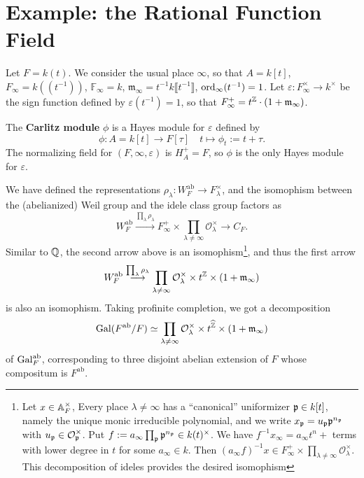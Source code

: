 \documentclass{article}
\newcommand{\F}{\mathbb{F}}
\renewcommand{\O}{\mathcal{O}}
\newcommand{\m}{\mathfrak{m}}
\newcommand{\llpar}{(\!(}
\newcommand{\rrpar}{)\!)}
\newcommand{\ab}{\mathrm{ab}}
\begin{document}
\section{Example: the Rational Function Field}
Let $F = k(t)$.
We consider the usual place $\infty$, so that $A = k[t]$,
$F_\infty = k\llpar t^{-1}\rrpar$,
$\F_\infty = k$,
$\m_\infty = t^{-1}k\llbracket t^{-1}\rrbracket$,
$\operatorname{ord}_{\infty}(t^{-1}) = 1$.
Let $\varepsilon : F_\infty^\times\to k^\times$ be the sign function defined by $\varepsilon(t^{-1}) = 1$,
so that $F_\infty^+ = t^{\Z}\cdot(1 + \m_\infty)$.


The \textbf{Carlitz module} $\phi$ is a Hayes module for $\varepsilon$ defined by \[\phi : A = k[t]\to F[\tau]\quad t\mapsto \phi_t := t + \tau.\]
The normalizing field for $(F, \infty, \varepsilon)$ is $H_A^+ = F$,
so $\phi$ is the only Hayes module for $\varepsilon$.

We have defined the representations $\rho_\lambda : W_F^\ab\to F_\lambda^\times$,
and the isomophism between the (abelianized) Weil group and the idele class group factors as
\begin{equation}\label{formula: the isomophism from Weil group of rational function field to idele class group}
    W_F^\ab \stackrel{\prod_{\lambda}\rho_\lambda}{\longrightarrow} F_\infty^+\times\prod_{\lambda\ne\infty}\O_\lambda^\times\to C_F.
\end{equation}
Similar to $\mathbb{Q}$, the second arrow above is an isomophism\footnote{
Let $x\in \mathbb{A}_F^\times$,
Every place $\lambda\ne\infty$ has a ``canonical'' uniformizer $\mathfrak{p}\in k[t]$, namely the unique monic irreducible polynomial,
and we write $x_{\mathfrak{p}} = u_{\mathfrak{p}}\mathfrak{p}^{n_{\mathfrak{p}}}$ with $u_\p\in \O_\p^\times$.
Put $f := a_\infty\prod_{\mathfrak{p}}\mathfrak{p}^{n_{\mathfrak{p}}}\in k(t)^\times$.
We have $f^{-1}x_\infty = a_\infty t^{n} + {}$ terms with lower degree in $t$ for some $a_\infty\in k$.
Then $(a_\infty f)^{-1}x\in F_\infty^+\times\prod_{\lambda\ne\infty}\O_\lambda^\times$.
This decomposition of ideles provides the desired isomophism
}, and thus the first arrow
\[W_F^\ab\stackrel{\prod_{\lambda}\rho_\lambda}{\longrightarrow} \prod_{\lambda\ne\infty}\O_\lambda^\times \times t^{\Z}\times (1 + \m_\infty)\]
is also an isomophism.
Taking profinite completion, we got a decomposition
\[\gal(F^\ab/F)
\simeq \prod_{\lambda\ne\infty}\O_\lambda^\times \times t^{\hat\Z}\times (1 + \m_\infty)\]
of $\gal_F^\ab$, corresponding to three disjoint abelian extension of $F$ whose compositum is $F^\ab$.
\end{document}
